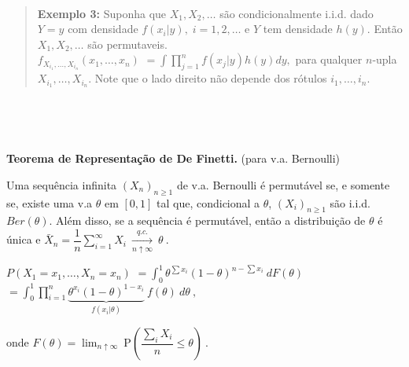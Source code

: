 \documentclass[
]{book}
\begin{document}
\(~\)

\begin{quote}
\textbf{Exemplo 3:} Suponha que \(X_1,X_2,\ldots\) são condicionalmente i.i.d. dado \(Y=y\) com densidade \(f(x_i|y),\;i=1,2,\ldots\) e \(Y\) tem densidade \(h(y)\). Então \(X_1,X_2,\ldots\) são permutaveis.\\
\(f_{X_{i_1},\ldots,X_{i_n}}(x_1,\ldots,x_n)\) \(=\displaystyle\int\prod_{j=1}^nf(x_j|y)h(y)dy,\) para qualquer \(n\)-upla \(X_{i_1},\ldots,X_{i_n}\). Note que o lado direito não depende dos rótulos \(i_1,\ldots,i_n\).
\end{quote}

\(~\)

\(~\)

\textbf{Teorema de Representação de De Finetti.} (para v.a. Bernoulli)

Uma sequência infinita \(\left(X_n\right)_{n\geq 1}\) de v.a. Bernoulli é permutável se, e somente se, existe uma v.a \(\theta\) em \([0,1]\) tal que, condicional a \(\theta\), \(\left(X_i\right)_{n\geq 1}\) são i.i.d. \(Ber(\theta)\). Além disso, se a sequência é permutável, então a distribuição de \(\theta\) é única e \(\displaystyle\bar{X}_n = \dfrac{1}{n}\sum_{i=1}^\infty X_i ~\underset{n\uparrow\infty}{\overset{q.c.}{\longrightarrow}}~\theta~.\)

\(P(X_1=x_1,\ldots,X_n=x_n)\) \(=\displaystyle\int_0^1\theta^{\sum x_i}(1-\theta)^{n-\sum x_i}~dF(\theta)\) \(=\displaystyle\int_0^1\prod_{i=1}^n\underbrace{\theta^{x_i}(1-\theta)^{1-x_i}}_{f(x_i|\theta)}~f(\theta)~d\theta~,\)

onde \(F(\theta)=\displaystyle\lim_{n\uparrow\infty}~\text{P}\left(\dfrac{\sum_iX_i}{n}\leq \theta\right)~.\)

\(~\)

\(~\)
\end{document}
